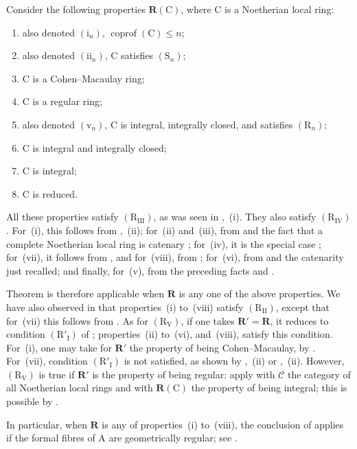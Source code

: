 \begin{examples}[7.5.3]
\label{IV.7.5.3}
Consider the following properties $\boldsymbol{R}(\mathrm{C})$, where $\mathrm{C}$ is a Noetherian local ring:
\begin{enumerate}[label=(\roman*)]
  \item also denoted $(\mathrm{i}_n)$, $\operatorname{coprof}(\mathrm{C})\leqslant n$;
  \item also denoted $(\mathrm{ii}_n)$, $\mathrm{C}$ satisfies $(\mathrm{S}_n)$;
  \item $\mathrm{C}$ is a Cohen--Macaulay ring;
  \item $\mathrm{C}$ is a regular ring;
  \item also denoted $(\mathrm{v}_n)$, $\mathrm{C}$ is integral, integrally closed, and satisfies $(\mathrm{R}_n)$;
  \item $\mathrm{C}$ is integral and integrally closed;
  \item $\mathrm{C}$ is integral;
  \item $\mathrm{C}$ is reduced.
\end{enumerate}
All these properties satisfy $(\mathrm{R}_{\mathrm{III}})$, as was seen in ,~(i). They also satisfy $(\mathrm{R}_{\mathrm{IV}})$. For~(i), this follows from ,~(ii); for~(ii) and~(iii), from  and the fact that a complete Noetherian local ring is catenary ; for~(iv), it is the special case ; for~(vii), it follows from , and for~(viii), from ; for~(vi), from  and the catenarity just recalled; and finally, for~(v), from the preceding facts and .

Theorem  is therefore applicable when $\boldsymbol{R}$ is any one of the above properties. We have also observed in  that properties~(i) to~(viii) satisfy $(\mathrm{R}_{\mathrm{II}})$, except that for~(vii) this follows from . As for $(\mathrm{R}_{\mathrm{V}})$, if one takes $\boldsymbol{R}'=\boldsymbol{R}$, it reduces to condition $(\mathrm{R}'_{\mathrm{I}})$ of ; properties~(ii) to~(vi), and~(viii), satisfy this condition. For~(i), one may take for $\boldsymbol{R}'$ the property of being Cohen--Macaulay, by . For~(vii), condition $(\mathrm{R}'_{\mathrm{I}})$ is not satisfied, as shown by ,~(ii) or ,~(ii). However, $(\mathrm{R}_{\mathrm{V}})$ is true if $\boldsymbol{R}'$ is the property of being regular: apply  with $\mathcal{C}$ the category of all Noetherian local rings and with $\boldsymbol{R}(\mathrm{C})$ the property of being integral; this is possible by .

In particular, when $\boldsymbol{R}$ is any of properties~(i) to~(viii), the conclusion of  applies if the formal fibres of $\mathrm{A}$ are geometrically regular; see .
\end{examples}

